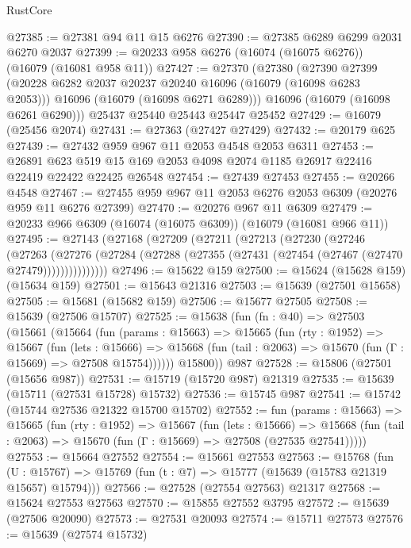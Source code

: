 \begin{lexlean}{RustCore}
\begin{coremodule}
@27385 := @27381 @94 @11 @15 @6276
@27390 := @27385 @6289 @6299 @2031 @6270 @2037
@27399 := @20233 @958 @6276 (@16074 (@16075 @6276)) (@16079 (@16081 @958 @11))
@27427 := @27370
    (@27380
      (@27390
        @27399
        (@20228 @6282 @2037 @20237 @20240 @16096 (@16079 (@16098 @6283 @2053)))
        @16096
        (@16079 (@16098 @6271 @6289)))
      @16096
      (@16079 (@16098 @6261 @6290)))
    @25437
    @25440
    @25443
    @25447
    @25452
@27429 := @16079 (@25456 @2074)
@27431 := @27363 (@27427 @27429)
@27432 := @20179 @625
@27439 := @27432 @959 @967 @11 @2053 @4548 @2053 @6311
@27453 := @26891
    @623
    @519
    @15
    @169
    @2053
    @4098
    @2074
    @1185
    @26917
    @22416
    @22419
    @22422
    @22425
    @26548
@27454 := @27439 @27453
@27455 := @20266 @4548
@27467 := @27455 @959 @967 @11 @2053 @6276 @2053 @6309 (@20276 @959 @11 @6276 @27399)
@27470 := @20276 @967 @11 @6309
@27479 := @20233 @966 @6309 (@16074 (@16075 @6309)) (@16079 (@16081 @966 @11))
@27495 := @27143
    (@27168
      (@27209
        (@27211
          (@27213
            (@27230
              (@27246
                (@27263
                  (@27276
                    (@27284 (@27288 (@27355 (@27431 (@27454 (@27467 (@27470 @27479)))))))))))))))
@27496 := @15622 @159
@27500 := @15624 (@15628 @159) (@15634 @159)
@27501 := @15643 @21316
@27503 := @15639 (@27501 @15658)
@27505 := @15681 (@15682 @159)
@27506 := @15677 @27505
@27508 := @15639 (@27506 @15707)
@27525 := @15638
    (fun (fn : @40) =>
    @27503
      (@15661
        (@15664
          (fun (params : @15663) =>
          @15665
            (fun (rty : @1952) =>
            @15667
              (fun (lets : @15666) =>
              @15668 (fun (tail : @2063) => @15670 (fun (Γ : @15669) => @27508 @15754))))))
        @15800))
    @987
@27528 := @15806 (@27501 (@15656 @987))
@27531 := @15719 (@15720 @987) @21319
@27535 := @15639 (@15711 (@27531 @15728) @15732)
@27536 := @15745 @987
@27541 := @15742 (@15744 @27536 @21322 @15700 @15702)
@27552 := fun (params : @15663) =>
  @15665
    (fun (rty : @1952) =>
    @15667
      (fun (lets : @15666) =>
      @15668 (fun (tail : @2063) => @15670 (fun (Γ : @15669) => @27508 (@27535 @27541)))))
@27553 := @15664 @27552
@27554 := @15661 @27553
@27563 := @15768
    (fun (U : @15767) => @15769 (fun (t : @7) => @15777 (@15639 (@15783 @21319 @15657) @15794)))
@27566 := @27528 (@27554 @27563) @21317
@27568 := @15624 @27553 @27563
@27570 := @15855 @27552 @3795
@27572 := @15639 (@27506 @20090)
@27573 := @27531 @20093
@27574 := @15711 @27573
@27576 := @15639 (@27574 @15732)

\end{coremodule}
\end{lexlean}
